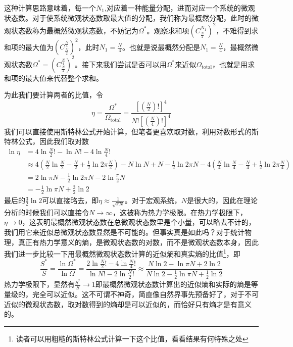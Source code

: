 \documentclass[../../main.tex]{subfiles}
\begin{document}
这种计算思路意味着，每一个\(N_1\),对应着一种能量分配，进而对应一个系统的微观状态数。对于使系统微观状态数取最大值的分配，我们称为最概然分配，此时的微观状态数称为最概然微观状态数，不妨记为\(\Omega^*\)。观察求和项\(\left(C_{\frac{N}{2}}^{N_1}\right)^2\)，不难得到求和项的最大值为\(\left(C_{\frac{N}{2}}^{\frac{N}{4}}\right)^2\)，此时\(N_1=\frac{N}{4}\)。也就是说最概然分配是\(N_1=\frac{N}{4}\)，最概然微观状态数\(\Omega^*=\left(C_{\frac{N}{2}}^{\frac{N}{4}}\right)^2\)。接下来我们尝试是否可以用\(\Omega^*\)来近似\(\Omega_{\text{total}}\)，也就是用求和项的最大值来代替整个求和。

为此我们要计算两者的比值，令
\begin{equation*}
    \eta=\frac{\Omega^*}{\Omega_{\text{total}}}=\frac{\left[\left(\frac{N}{2}\right)!\right]^4}{N!\left[\left(\frac{N}{4}\right)!\right]^4}
\end{equation*}
我们可以直接使用斯特林公式开始计算，但笔者更喜欢取对数，利用对数形式的斯特林公式，因此我们取对数
\begin{equation*}
    \begin{split}
        \ln \eta&=4\ln \frac{N}{2}!-\ln N!-4\ln \frac{N}{4}! \\
        &\approx 4\left(\frac{N}{2}\ln \frac{N}{2}-\frac{N}{2}+\frac{1}{2}\ln 2\pi\frac{N}{2}\right)-N\ln N+N-\frac{1}{2}\ln 2\pi N-4\left(\frac{N}{4}\ln \frac{N}{4}-\frac{N}{4}+\frac{1}{2}\ln 2\pi\frac{N}{4}\right) \\
        &=2\ln \pi N-\frac{1}{2}\ln 2\pi N-2\ln \frac{\pi}{2}N \\
        &=-\frac{1}{2}\ln \pi N+\frac{3}{2}\ln 2
    \end{split}
\end{equation*}
最后的\(\frac{3}{2}\ln 2\)可以直接略去，即\(\eta\approx \frac{1}{\sqrt{\pi N}}\)。对于宏观系统，\(N\)是很大的，因此在理论分析的时候我们可以直接令\(N\to \infty\)，这被称为热力学极限。在热力学极限下，\(\eta\to 0\)，这表明最概然微观状态数在总微观状态数里是个小量，可以略去不计的，我们用它来近似总微观状态数显然是不可能的。但事实真是如此吗？对于统计物理，真正有热力学意义的熵，是微观状态数的对数，而不是微观状态数本身，因此我们进一步比较一下用最概然微观状态数计算的近似熵和真实熵的比值\footnote{读者可以用粗糙的斯特林公式计算一下这个比值，看看结果有何特殊之处}，即
\begin{equation*}
    \frac{S^*}{S}=\frac{\ln \Omega^*}{\ln \Omega}=\frac{2\ln \frac{N}{2}!-4\ln \frac{N}{4}!}{\ln N!-2\ln \frac{N}{2}!}\approx \frac{N\ln2-\ln\pi N+2\ln2}{N\ln2-\frac{1}{2}\ln\pi N+\frac{1}{2}\ln2}
\end{equation*}
热力学极限下，显然有\(\frac{S^*}{S}\to 1\)即最概然微观状态数计算出的近似熵和实际的熵是等量级的，完全可以近似。这不可谓不神奇，简直像自然界事先预备好了，对于不可近似的微观状态数，取对数得到的熵却是可以近似的，而恰好只有熵才是有意义的。
\end{document}
